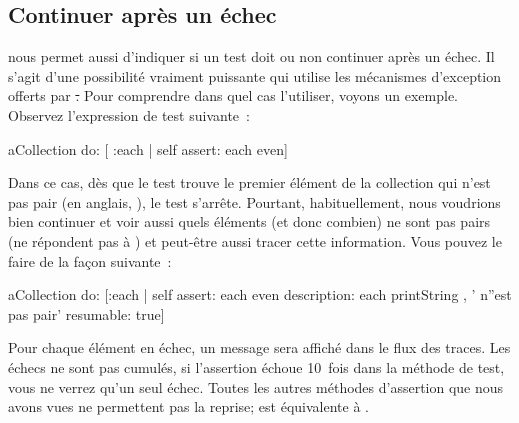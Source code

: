 \documentclass[a4paper,10pt,twoside]{book}
\begin{document}
\subsection{Continuer après un échec}
\sunit nous permet aussi d'indiquer si un test doit ou non continuer après un échec. Il s'agit d'une possibilité vraiment puissante qui utilise les mécanismes d'exception offerts par \st. Pour comprendre dans quel cas l'utiliser, voyons un exemple. Observez l'expression de test suivante~:
\begin{code}{}
aCollection do: [ :each | self assert: each even]
\end{code}
Dans ce cas, dès que le test trouve le premier élément de la collection qui n'est pas pair (en anglais, ), le test s'arrête. Pourtant, habituellement, nous voudrions bien continuer et voir aussi quels éléments (et donc combien) ne sont pas pairs (\ie ne répondent pas à ) et peut-être aussi tracer cette information. Vous pouvez le faire de la façon suivante~:
\begin{code}{}
aCollection do:
	[:each |
	self
		assert: each even
		description: each printString , ' n''est pas pair'
		resumable: true]
\end{code}
Pour chaque élément en échec, un message sera affiché dans le flux des traces. Les échecs ne sont pas cumulés, \ie si l'assertion échoue 10~fois dans la méthode de test, vous ne verrez qu'un seul échec. Toutes les autres méthodes d'assertion que nous avons vues ne permettent pas la reprise;
 est équivalente à .

\end{document}

